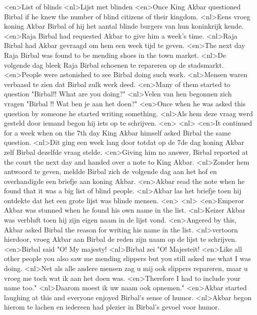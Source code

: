<en>List of blinds
<nl>Lijst met blinden
<en>Once King Akbar questioned Birbal if he knew the number of blind citizens of their kingdom.
<nl>Eens vroeg koning Akbar Birbal of hij het aantal blinde burgers van hun koninkrijk kende.
<en>Raja Birbal had requested Akbar to give him a week’s time.
<nl>Raja Birbal had Akbar gevraagd om hem een week tijd te geven.
<en>The next day Raja Birbal was found to be mending shoes in the town market.
<nl>De volgende dag bleek Raja Birbal schoenen te repareren op de stadsmarkt.
<en>People were astonished to see Birbal doing such work.
<nl>Mensen waren verbaasd te zien dat Birbal zulk werk deed.
<en>Many of them started to question "Birbal!! What are you doing?"
<nl>Velen van hen begonnen zich  vragen "Birbal !! Wat ben je aan het doen?"
<en>Once when he was asked this question by someone he started writing something.
<nl>Als hem deze vraag werd gesteld door iemand begon hij iets op te schrijven.
<en>
<nl>
<en>It continued for a week when on the 7th day King Akbar himself asked Birbal the same question.
<nl>Dit ging een week lang door totdat op de 7de dag koning Akbar zelf  Birbal dezelfde vraag stelde.
<en>Giving him no answer, Birbal reported at the court the next day and handed over a note to King Akbar.
<nl>Zonder hem antwoord te geven, meldde Birbal zich de  volgende dag aan het hof en overhandigde een briefje aan koning Akbar.
<en>Akbar read the note when he found that it was a big list of blind people.
<nl>Akbar las het briefje toen hij ontdekte dat het een grote lijst was blinde  mensen.
<en>
<nl>
<en>Emperor Akbar was stunned when he found his own name in the list.
<nl>Keizer Akbar was verbluft toen hij zijn eigen naam in de lijst vond.
<en>Angered by this, Akbar asked Birbal the reason for writing his name in the list.
<nl>vertoorn hierdoor, vroeg Akbar aan Birbal de reden zijn naam op de lijst te schrijven.
<en>Birbal said "O! My majesty!
<nl>Birbal zei "O!  Majesteit!
<en>Like all other people you also saw me mending slippers but you still asked me what I was doing.
<nl>Net als alle andere mensen zag u mij ook slippers repareren, maar u vroeg me toch wat ik aan het doen was.
<en>Therefore I had to include your name too."
<nl>Daarom moest ik uw naam ook opnemen."
<en>Akbar started laughing at this and everyone enjoyed Birbal's sense of humor.
<nl>Akbar begon hierom te lachen en iedereen had plezier in Birbal's gevoel voor humor.
